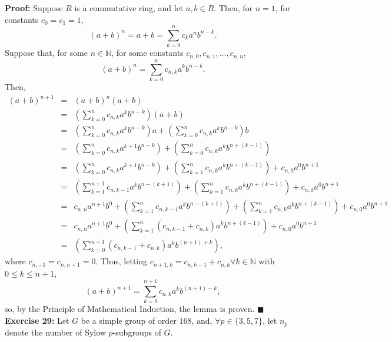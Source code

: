 \documentclass{article}%
\begin{document}
\textbf{Proof:} Suppose $R$ is a commutative ring, and let $a,b \in R$. Then,
for $n = 1$, for constants $c_0 = c_1 = 1$, \[(a + b)^n = a + b =
\sum_{k = 0}^n c_k a^nb^{n - k}.\] Suppose that, for some $n \in \mathbb{N}$,
for some constants $c_{n,0},c_{n,1},\ldots,c_{n,n}$, \[(a + b)^n =
\sum_{k = 0}^n c_{n,k} a^kb^{n - k}.\] Then,
\begin{eqnarray*}
(a + b)^{n + 1} & = & (a + b)^n(a + b) \\
& = & \left(\sum_{k = 0}^n c_{n,k} a^kb^{n - k}\right) (a + b) \\
& = & \left(\sum_{k = 0}^n c_{n,k} a^kb^{n - k}\right)a
  + \left(\sum_{k = 0}^n c_{n,k} a^kb^{n - k}\right)b \\
& = & \left(\sum_{k = 0}^n c_{n,k} a^{k + 1}b^{n - k}\right)
  + \left(\sum_{k = 0}^n c_{n,k} a^kb^{n + (k - 1)}\right) \\
& = & \left(\sum_{k = 0}^n c_{n,k} a^{k + 1}b^{n - k}\right)
  + \left(\sum_{k = 1}^n c_{n,k} a^kb^{n + (k - 1)}\right)
                                                      + c_{n,0}a^0b^{n + 1}\\
& = & \left(\sum_{k = 1}^{n + 1} c_{n,k - 1} a^kb^{n - (k + 1)}\right)
  + \left(\sum_{k = 1}^n c_{n,k} a^kb^{n + (k - 1)}\right)
                                                      + c_{n,0}a^0b^{n + 1}\\
& = & c_{n,n} a^{n + 1}b^0 + \left(\sum_{k = 1}^n c_{n,k - 1}
                                                    a^kb^{n - (k + 1)}\right)
  + \left(\sum_{k = 1}^n c_{n,k} a^kb^{n + (k - 1)}\right)
                                                      + c_{n,0}a^0b^{n + 1}\\
& = & c_{n,n} a^{n + 1}b^0
  + \left(\sum_{k = 1}^n \left(c_{n,k - 1} + c_{n,k}\right)
                                                    a^kb^{n + (k - 1)}\right)
  + c_{n,0}a^0b^{n + 1}\\
& = & \left(\sum_{k = 0}^{n + 1} \left(c_{n,k - 1} + c_{n,k}\right)
                                                    a^kb^{(n + 1) + k}\right),
\end{eqnarray*}
where $c_{n,-1} = c_{n,n + 1} = 0$.
Thus, letting $c_{n + 1,k} = c_{n,k - 1} + c_{n,k} \forall k \in \mathbb{N}$
with $0 \leq k \leq n + 1$,
\[(a + b)^{n + 1} = \sum_{k = 0}^{n + 1} c_{n,k} a^kb^{(n + 1) - k},\]
so, by the Principle of Mathematical Induction, the lemma is proven. \qquad
$\blacksquare$\\

\textbf{Exercise 29:} Let $G$ be a simple group of order $168$, and, $\forall
p \in \{3,5,7\}$, let $n_p$ denote the number of Sylow $p$-subgroups of $G$.
\end{document}
